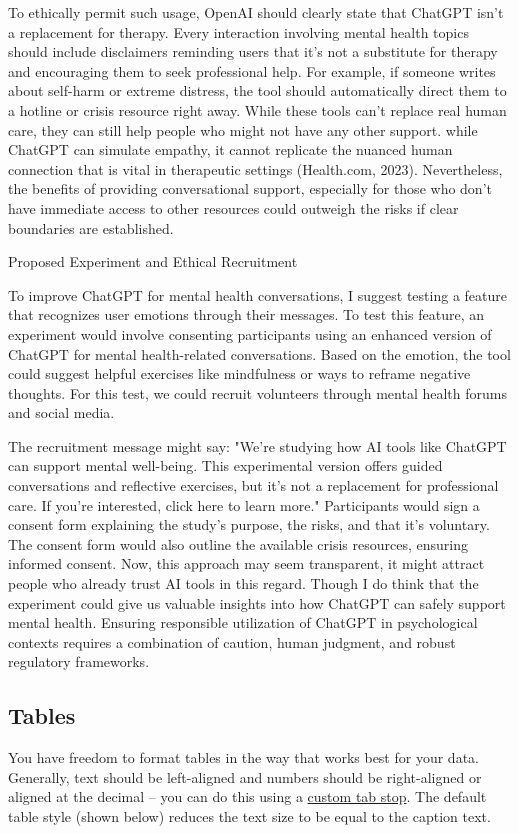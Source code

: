 \documentclass[
	letterpaper, %
]{jdf}
\begin{document}
To ethically permit such usage, OpenAI should clearly state that ChatGPT isn’t a replacement for therapy. Every interaction involving mental health topics should include disclaimers reminding users that it’s not a substitute for therapy and encouraging them to seek professional help. For example, if someone writes about self-harm or extreme distress, the tool should automatically direct them to a hotline or crisis resource right away. While these tools can’t replace real human care, they can still help people who might not have any other support. while ChatGPT can simulate empathy, it cannot replicate the nuanced human connection that is vital in therapeutic settings (Health.com, 2023). Nevertheless, the benefits of providing conversational support, especially for those who don't have immediate access to other resources could outweigh the risks if clear boundaries are established.

Proposed Experiment and Ethical Recruitment

To improve ChatGPT for mental health conversations, I suggest testing a feature that recognizes user emotions through their messages. To test this feature, an experiment would involve consenting participants using an enhanced version of ChatGPT for mental health-related conversations. Based on the emotion, the tool could suggest helpful exercises like mindfulness or ways to reframe negative thoughts. For this test, we could recruit volunteers through mental health forums and social media.

The recruitment message might say: "We’re studying how AI tools like ChatGPT can support mental well-being. This experimental version offers guided conversations and reflective exercises, but it’s not a replacement for professional care. If you’re interested, click here to learn more." Participants would sign a consent form explaining the study’s purpose, the risks, and that it’s voluntary. The consent form would also outline the available crisis resources, ensuring informed consent. Now, this approach may seem transparent, it might attract people who already trust AI tools in this regard. Though I do think that the experiment could give us valuable insights into how ChatGPT can safely support mental health. Ensuring responsible utilization of ChatGPT in psychological contexts requires a combination of caution, human judgment, and robust regulatory frameworks.


\newpage
\subsection{Tables}
You have freedom to format tables in the way that works best for your data. Generally, text should be left-aligned and numbers should be right-aligned or aligned at the decimal – you can do this using a \href{https://practicaltypography.com/tabs-and-tab-stops.html}{custom tab stop}. The default table style (shown below) reduces the text size to be equal to the caption text.
\end{document}
